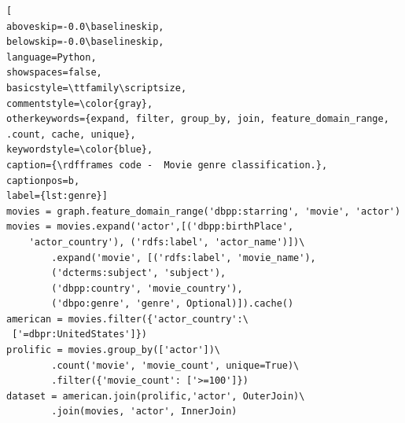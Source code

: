 \vspace{8pt}
\begin{lstlisting}[
aboveskip=-0.0\baselineskip,
belowskip=-0.0\baselineskip,
language=Python,
showspaces=false,
basicstyle=\ttfamily\scriptsize,
commentstyle=\color{gray},
otherkeywords={expand, filter, group_by, join, feature_domain_range, .count, cache, unique},
keywordstyle=\color{blue},
caption={\rdfframes code -  Movie genre classification.},
captionpos=b,
label={lst:genre}]
movies = graph.feature_domain_range('dbpp:starring', 'movie', 'actor')
movies = movies.expand('actor',[('dbpp:birthPlace',
    'actor_country'), ('rdfs:label', 'actor_name')])\
        .expand('movie', [('rdfs:label', 'movie_name'),
        ('dcterms:subject', 'subject'),
        ('dbpp:country', 'movie_country'),
        ('dbpo:genre', 'genre', Optional)]).cache()
american = movies.filter({'actor_country':\
 ['=dbpr:UnitedStates']})
prolific = movies.group_by(['actor'])\
        .count('movie', 'movie_count', unique=True)\
        .filter({'movie_count': ['>=100']})
dataset = american.join(prolific,'actor', OuterJoin)\
        .join(movies, 'actor', InnerJoin)
\end{lstlisting}
